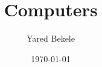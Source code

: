 \documentclass[a4paper]{article}
\begin{document}
    \title{Computers}
    \author{Yared Bekele}
    \date{\today}
    \maketitle
    \thispagestyle{empty}
    \pagebreak
\newpage
\tableofcontents
\listoffigures
\listoftables
    \newpage
    \pagestyle{plain}
    \setcounter{page}{1}
        
        
        
        
        
    \newpage
    \newpage
    \clearpage
        \nocite{*}
        
        
\end{document}
